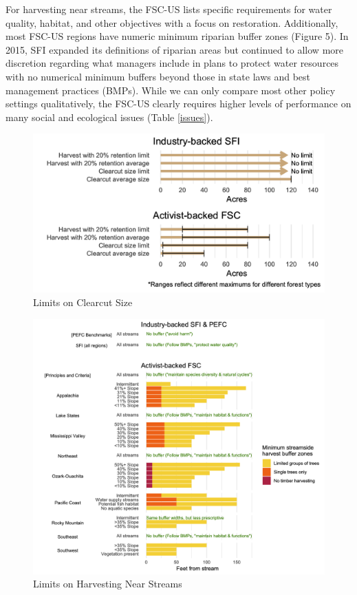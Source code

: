 \documentclass[
      12pt,
            Review ]{article}
\begin{document}
For harvesting near streams, the FSC-US lists specific requirements for water quality, habitat, and other objectives with a focus on restoration. Additionally, most FSC-US regions have numeric minimum riparian buffer zones (Figure 5). In 2015, SFI expanded its definitions of riparian areas but continued to allow more discretion regarding what managers include in plans to protect water resources with no numerical minimum buffers beyond those in state laws and best management practices (BMPs). While we can only compare most other policy settings qualitatively, the FSC-US clearly requires higher levels of performance on many social and ecological issues (Table \ref{issues}).

\begin{figure}
\centering
\includegraphics{clearcuts-1.png}
\caption{Limits on Clearcut Size\label{clearcuts}}
\end{figure}

\begin{figure}
\centering
\includegraphics{riparian-1.png}
\caption{Limits on Harvesting Near Streams\label{riparian}}
\end{figure}
\end{document}
